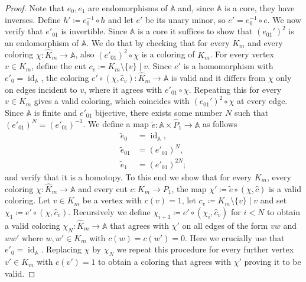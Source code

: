 \documentclass[oneside]{amsart}
\newcommand{\str}[1]{\mathbb{#1}}
\DeclareMathOperator{\id}{id}
\begin{document}
\begin{proof}
    Note that $e_{0},e_{1}$ are endomorphisms of $\str A$ and, since $\str A$ is a core, they have
    inverses.
    Define $h'\coloneq e_0^{-1}\circ h$
    and let $e'$ be its unary minor, so $e' = e_0^{-1}\circ e$. 
    We now verify that $e'_{01}$ is invertible. Since $\str A$ is a core it suffices to show that $(e_{01}')^2$ is an endomorphism of $\str A$. We do that by checking that for every $K_m$ and every coloring $\chi \colon \hat K_m \to \str A$, also $(e'_{01})^2\circ \chi$ is a coloring of $K_m$.
    For every vertex $v\in K_m$, define the cut $c_{v}\coloneq K_m\setminus \{v\} \mid v$.
    Since $e'$ is a homomorphism with $e'_{0} = \id_{\str A}$, the coloring $e'\circ (\chi, \hat c_v)\colon \hat K_m \to \str A$ is valid and it differs from $\chi$ only on edges incident to $v$, where it agrees with $e'_{01}\circ \chi$.
    Repeating this for every $v\in K_m$ gives a valid coloring, which coincides with $(e_{01}')^2\circ \chi$ at every edge. 
    Since $\str A$ is finite and $e'_{01}$  bijective, there exists some number $N$ such that $(e'_{01})^N = (e'_{01})^{-1}$. We define a map $\tilde e \colon \str A \times \hat P_1 \to \str A$ as follows
    \begin{align*}
        \tilde e_0 &= \id_{\str A},\\
        \tilde e_{01} &= (e'_{01})^N,\\
        \tilde e_1 &= (e'_{01})^{2N};
    \end{align*}
    and verify that it is a homotopy. To this end we show that for every $K_m$, every coloring $\chi\colon \hat K_m \to \str A$ and every cut $c\colon K_m \to P_1$, the map $\chi' \coloneq \tilde e \circ (\chi, \hat c)$ is a valid coloring. 
    Let $v \in K_m$ be a vertex with $c(v) = 1$, let $c_v \coloneq K_m \setminus \{v\} \mid v$ and set $\chi_1 \coloneq e' \circ (\chi,\hat c_v)$. Recursively we define $\chi_{i+1} \coloneq e' \circ (\chi_i,\hat c_v)$ for $i < N$ to obtain a valid coloring $\chi_N \colon \hat K_m \to \str A$ that agrees with $\chi'$ on all edges of the form $vw$ and $w w'$ where $w, w' \in K_m$ with  $c(w)= c(w')=0$. Here we crucially use that $e'_0 = \id_{\str A}$.
    Replacing $\chi$ by $\chi_N$ we repeat this procedure for every further vertex $v' \in K_m$ with $c(v') = 1$ to obtain a coloring that agrees with $\chi'$ proving it to be valid.
    

\end{proof}
\end{document}
